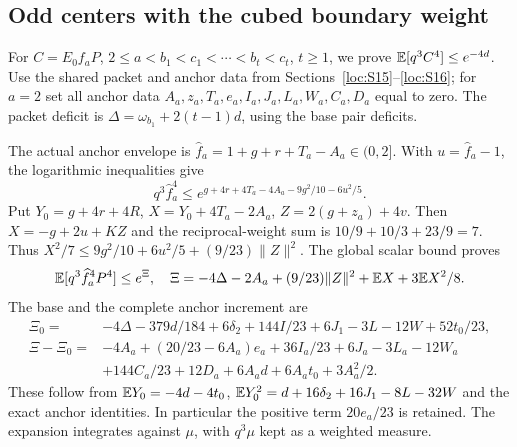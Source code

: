 \subsection{Odd centers with the cubed boundary weight}\label{loc:S18}
For $C=E_0f_aP$, $2\le a<b_1<c_1<\cdots<b_t<c_t$, $t\ge1$,
we prove $\mathbb E[q^3C^4]\le e^{-4d}$.
Use the shared packet and anchor data from Sections~\ref{loc:S15}--\ref{loc:S16};
for $a=2$ set all anchor data $A_a,z_a,T_a,e_a,I_a,J_a,L_a,W_a,C_a,D_a$
equal to zero. The packet deficit is
$\Delta=\omega_{b_1}+2(t-1)d$, using the base pair deficits.

The actual anchor envelope is $\widehat f_a=1+g+r+T_a-A_a\in(0,2]$.
With $u=\widehat f_a-1$, the logarithmic inequalities give
\[
 q^3\widehat f_a^4\le
 e^{g+4r+4T_a-4A_a-9g^2/10-6u^2/5}.
\]
Put $Y_0=g+4r+4R$, $X=Y_0+4T_a-2A_a$, $Z=2(g+z_a)+4v$.
Then $X=-g+2u+KZ$ and the reciprocal-weight sum is
$10/9+10/3+23/9=7$. Thus
$X^2/7\le9g^2/10+6u^2/5+(9/23)\|Z\|^2$.
The global scalar bound proves
\[
 \mathbb E[q^3\widehat f_a^4P^4]\le e^\Xi,\quad
 \Xi=-4\Delta-2A_a+(9/23)\|Z\|^2+\mathbb E X+3\mathbb E X^2/8.
\]
The base and the complete anchor increment are
\begin{align*}
 \Xi_0={}&-4\Delta-379d/184+6\delta_{2}+144I/23+6J_1-3L-12W+52t_0/23,\\
 \Xi-\Xi_0={}&-4A_a+(20/23-6A_a)e_a+36I_a/23+6J_a-3L_a-12W_a\\
 &+144C_a/23+12D_a+6A_ad+6A_at_0+3A_a^2/2.
\end{align*}
These follow from $\mathbb E Y_0=-4d-4t_0$,
$\mathbb E Y_0^2=d+16\delta_{2}+16J_1-8L-32W$ and the exact anchor identities.
In particular the positive term $20e_a/23$ is retained.
The expansion integrates against $\mu$, with $q^3\mu$ kept as a weighted measure.

